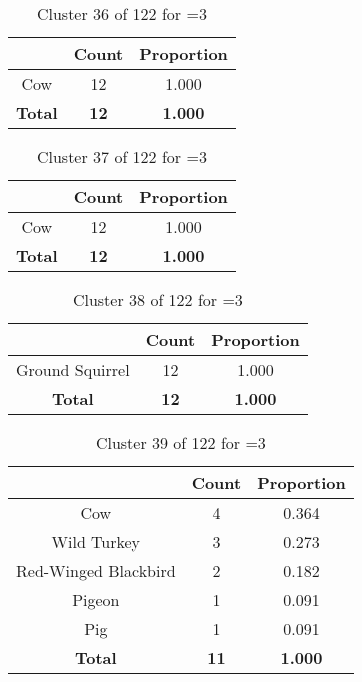 \begin{table}[ht!]
\centering
\begin{tabular}{|c|c|c|}
\hline
\bf \Spec{} &\bf Count &\bf Proportion\\ \hline \hline
Cow & 12 & 1.000\\ \hline
\hline
\bf Total & \bf 12 & \bf 1.000\\ \hline
\end{tabular}
\label{tab:cluster:36:3}
\caption{Cluster 36 of 122 for \minneigh{}=3}
\end{table}

\begin{table}[ht!]
\centering
\begin{tabular}{|c|c|c|}
\hline
\bf \Spec{} &\bf Count &\bf Proportion\\ \hline \hline
Cow & 12 & 1.000\\ \hline
\hline
\bf Total & \bf 12 & \bf 1.000\\ \hline
\end{tabular}
\label{tab:cluster:37:3}
\caption{Cluster 37 of 122 for \minneigh{}=3}
\end{table}

\begin{table}[ht!]
\centering
\begin{tabular}{|c|c|c|}
\hline
\bf \Spec{} &\bf Count &\bf Proportion\\ \hline \hline
Ground Squirrel & 12 & 1.000\\ \hline
\hline
\bf Total & \bf 12 & \bf 1.000\\ \hline
\end{tabular}
\label{tab:cluster:38:3}
\caption{Cluster 38 of 122 for \minneigh{}=3}
\end{table}

\begin{table}[ht!]
\centering
\begin{tabular}{|c|c|c|}
\hline
\bf \Spec{} &\bf Count &\bf Proportion\\ \hline \hline
Cow & 4 & 0.364\\ \hline
Wild Turkey & 3 & 0.273\\ \hline
Red-Winged Blackbird & 2 & 0.182\\ \hline
Pigeon & 1 & 0.091\\ \hline
Pig & 1 & 0.091\\ \hline
\hline
\bf Total & \bf 11 & \bf 1.000\\ \hline
\end{tabular}
\label{tab:cluster:39:3}
\caption{Cluster 39 of 122 for \minneigh{}=3}
\end{table}

